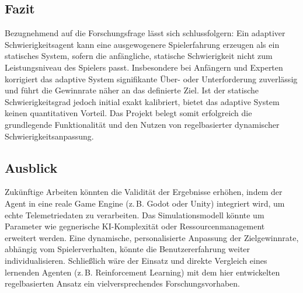 \documentclass[11pt,a4paper]{article}
\begin{document}
\subsection{Fazit}
Bezugnehmend auf die Forschungsfrage lässt sich schlussfolgern: Ein adaptiver Schwierigkeitsagent kann eine ausgewogenere Spielerfahrung erzeugen als ein statisches System, sofern die anfängliche, statische Schwierigkeit nicht zum Leistungsniveau des Spielers passt. Insbesondere bei Anfängern und Experten korrigiert das adaptive System signifikante Über- oder Unterforderung zuverlässig und führt die Gewinnrate näher an das definierte Ziel. Ist der statische Schwierigkeitsgrad jedoch initial exakt kalibriert, bietet das adaptive System keinen quantitativen Vorteil. Das Projekt belegt somit erfolgreich die grundlegende Funktionalität und den Nutzen von regelbasierter dynamischer Schwierigkeitsanpassung.

\subsection{Ausblick}
Zukünftige Arbeiten könnten die Validität der Ergebnisse erhöhen, indem der Agent in eine reale Game Engine (z.\,B. Godot oder Unity) integriert wird, um echte Telemetriedaten zu verarbeiten. Das Simulationsmodell könnte um Parameter wie gegnerische KI-Komplexität oder Ressourcenmanagement erweitert werden. Eine dynamische, personalisierte Anpassung der Zielgewinnrate, abhängig vom Spielerverhalten, könnte die Benutzererfahrung weiter individualisieren. Schließlich wäre der Einsatz und direkte Vergleich eines lernenden Agenten (z.\,B. Reinforcement Learning) mit dem hier entwickelten regelbasierten Ansatz ein vielversprechendes Forschungsvorhaben.
\end{document}
